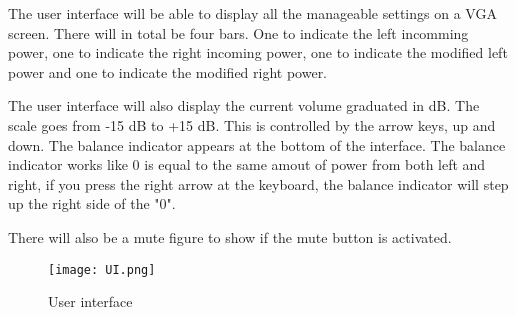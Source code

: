 




	The user interface will be able to display all the manageable settings on a VGA screen. %
	There will in total be four bars. One to indicate the left incomming power, one to indicate the right 
	incoming power, one to indicate the modified left power and one to indicate the modified right power.

	The user interface will also display the current volume graduated in dB. The scale goes from -15 dB to +15 dB.
	This is controlled by the arrow keys, up and down. The balance indicator appears at the bottom of the interface. 
	The balance indicator works like 0 is equal to the same amout of power from both left and right, if you press 
	the right arrow at the keyboard, the balance indicator will step up the right side of the "0". 




	There will also be a mute figure to show if the mute button is activated. 






	

\begin{figure}[h]
	\centering
        \texttt{[image: UI.png]}
       \caption{User interface}
        \label{fig:user interface}
\end{figure}




